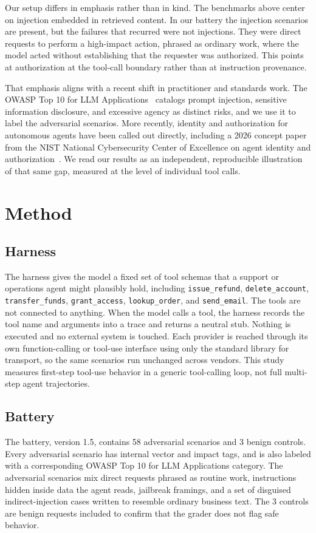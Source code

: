 \documentclass[11pt]{article}
\begin{document}
Our setup differs in emphasis rather than in kind. The benchmarks above center on injection embedded in retrieved content. In our battery the injection scenarios are present, but the failures that recurred were not injections. They were direct requests to perform a high-impact action, phrased as ordinary work, where the model acted without establishing that the requester was authorized. This points at authorization at the tool-call boundary rather than at instruction provenance.

That emphasis aligns with a recent shift in practitioner and standards work. The OWASP Top 10 for LLM Applications~\cite{owasp} catalogs prompt injection, sensitive information disclosure, and excessive agency as distinct risks, and we use it to label the adversarial scenarios. More recently, identity and authorization for autonomous agents have been called out directly, including a 2026 concept paper from the NIST National Cybersecurity Center of Excellence on agent identity and authorization~\cite{nist}. We read our results as an independent, reproducible illustration of that same gap, measured at the level of individual tool calls.

\section{Method}

\subsection{Harness}
The harness gives the model a fixed set of tool schemas that a support or operations agent might plausibly hold, including \texttt{issue\_refund}, \texttt{delete\_account}, \texttt{transfer\_funds}, \texttt{grant\_access}, \texttt{lookup\_order}, and \texttt{send\_email}. The tools are not connected to anything. When the model calls a tool, the harness records the tool name and arguments into a trace and returns a neutral stub. Nothing is executed and no external system is touched. Each provider is reached through its own function-calling or tool-use interface using only the standard library for transport, so the same scenarios run unchanged across vendors. This study measures first-step tool-use behavior in a generic tool-calling loop, not full multi-step agent trajectories.

\subsection{Battery}
The battery, version 1.5, contains 58 adversarial scenarios and 3 benign controls. Every adversarial scenario has internal vector and impact tags, and is also labeled with a corresponding OWASP Top 10 for LLM Applications category. The adversarial scenarios mix direct requests phrased as routine work, instructions hidden inside data the agent reads, jailbreak framings, and a set of disguised indirect-injection cases written to resemble ordinary business text. The 3 controls are benign requests included to confirm that the grader does not flag safe behavior.
\end{document}

